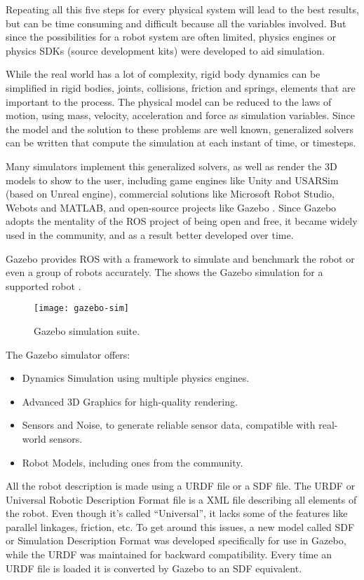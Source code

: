 Repeating all this five steps for every physical system will lead to the best results, but can be time consuming and difficult because all the variables involved. But since the possibilities for a robot system are often limited, physics engines or physics SDKs (source development kits) were developed to aid simulation.

While the real world has a lot of complexity, rigid body dynamics can be simplified in rigid bodies, joints, collisions, friction and springs, elements that are important to the process. The physical model can be reduced to the laws of motion, using mass, velocity, acceleration and force as simulation variables. Since the model and the solution to these problems are well known, generalized solvers can be written that compute the simulation at each instant of time, or timesteps.

Many simulators implement this generalized solvers, as well as render the 3D models to show to the user, including game engines like Unity and USARSim (based on Unreal engine), commercial solutions like Microsoft Robot Studio, Webots and MATLAB, and open-source projects like Gazebo \cite{craighead2007survey}. Since Gazebo adopts the mentality of the ROS project of being open and free, it became widely used in the community, and as a result better developed over time.

Gazebo provides ROS with a framework to simulate and benchmark the robot or even a group of robots accurately. The  shows the Gazebo simulation for a supported robot \cite{koenig2004design}.

\begin{figure}[!ht]
\centering
\texttt{[image: gazebo-sim]}
\caption{Gazebo simulation suite.}
\label{fig:gazebo-sim}
\end{figure}

The Gazebo simulator offers:

\begin{itemize}
\item Dynamics Simulation using multiple physics engines.
\item Advanced 3D Graphics for high-quality rendering.
\item Sensors and Noise, to generate reliable sensor data, compatible with real-world sensors.
\item Robot Models, including ones from the community.
\end{itemize}

All the robot description is made using a URDF file or a SDF file. The URDF or Universal Robotic Description Format file is a XML file describing all elements of the robot. Even though it's called ``Universal'', it lacks some of the features like parallel linkages, friction, etc. To get around this issues, a new model called SDF or  Simulation Description Format was developed specifically for use in Gazebo, while the URDF was maintained for backward compatibility. Every time an URDF file is loaded it is converted by Gazebo to an SDF equivalent.

